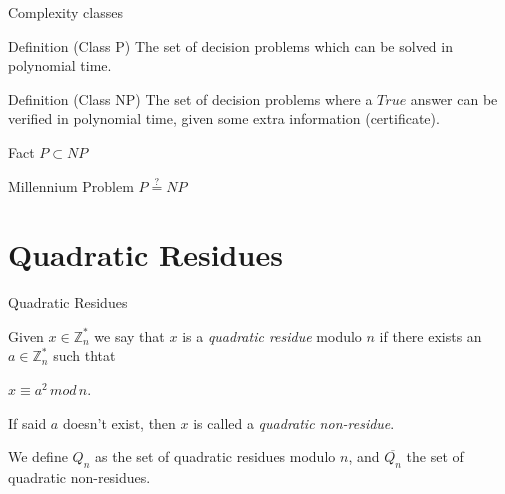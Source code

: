 \documentclass{beamer}
\begin{document}
\begin{frame}{Complexity classes}

\begin{block}{Definition (Class P)}
	The set of decision problems which can be solved in polynomial time.
\end{block}

\begin{block}{Definition (Class NP)}
	The set of decision problems where a $True$ answer can be verified in polynomial time, given some extra information (certificate).
\end{block}

\begin{block}{Fact}
	$P\subset NP$
\end{block}

\begin{block}{Millennium Problem}
	$P\overset{?}{=} NP$ %
\end{block}


\end{frame}






\section{Quadratic Residues}

\begin{frame}{Quadratic Residues}
\begin{definition}
	Given $x\in \mathbb{Z}^*_n$ we say that $x$ is a \textit{quadratic residue}
	modulo $n$ if there exists an $a \in \mathbb{Z}^*_n$ such thtat
	
	$x \equiv a^2 \, mod \, n$.
	
	If said $a$ doesn't exist, then $x$ is called a \textit{quadratic non-residue}.
\end{definition}

We define $Q_n$ as the set of quadratic residues modulo $n$, and $\overline{Q_n}$ the set of quadratic non-residues.
\end{frame}



%
%		
%		
%
\end{document}
